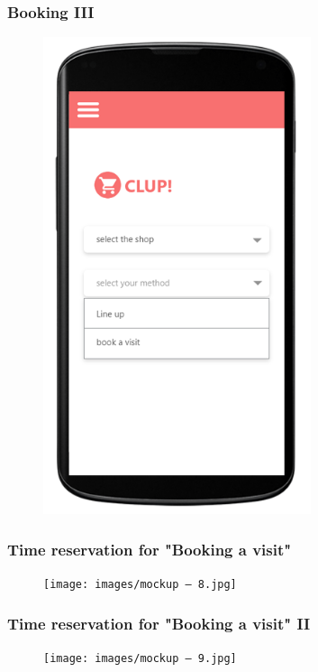 \subsubsection{Booking III}
\begin{figure}[H]
  \centering
  \includegraphics[width=0.7\textwidth,keepaspectratio]{images/11.png}
\end{figure}

\subsubsection{Time reservation for "Booking a visit" }
\begin{figure}[H]
  \centering
  \texttt{[image: images/mockup – 8.jpg]}
\end{figure}

\subsubsection{Time reservation for "Booking a visit" II}
\begin{figure}[H]
  \centering
  \texttt{[image: images/mockup – 9.jpg]}
\end{figure}

